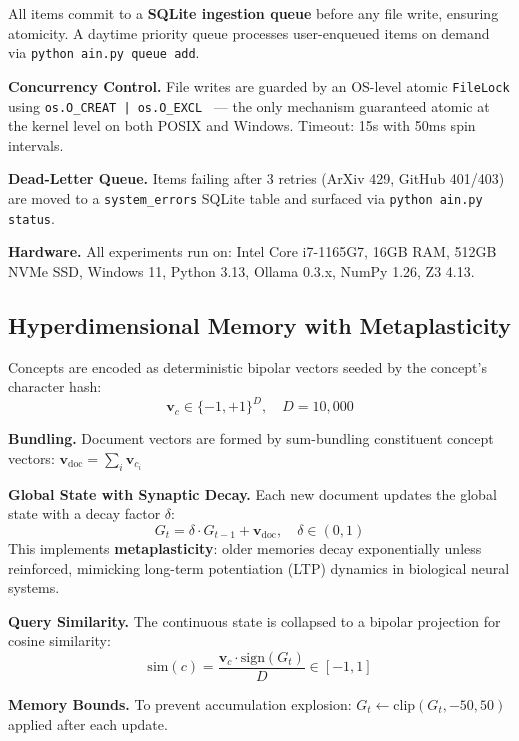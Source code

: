 \documentclass[sigconf]{acmart}
\begin{document}
All items commit to a \textbf{SQLite ingestion queue} before any file write, ensuring atomicity. A daytime priority queue processes user-enqueued items on demand via \texttt{python ain.py queue add}.

\textbf{Concurrency Control.} File writes are guarded by an OS-level atomic \texttt{FileLock} using \texttt{os.O\_CREAT | os.O\_EXCL}~\cite{posix_open} --- the only mechanism guaranteed atomic at the kernel level on both POSIX and Windows. Timeout: 15s with 50ms spin intervals.

\textbf{Dead-Letter Queue.} Items failing after 3 retries (ArXiv 429, GitHub 401/403) are moved to a \texttt{system\_errors} SQLite table and surfaced via \texttt{python ain.py status}.

\textbf{Hardware.} All experiments run on: Intel Core i7-1165G7, 16GB RAM, 512GB NVMe SSD, Windows 11, Python 3.13, Ollama 0.3.x, NumPy 1.26, Z3 4.13.

\subsection{Hyperdimensional Memory with Metaplasticity}

Concepts are encoded as deterministic bipolar vectors seeded by the concept's character hash:
\[
  \mathbf{v}_c \in \{-1, +1\}^D, \quad D = 10{,}000
\]

\textbf{Bundling.} Document vectors are formed by sum-bundling constituent concept vectors:
$\mathbf{v}_{\text{doc}} = \sum_i \mathbf{v}_{c_i}$

\textbf{Global State with Synaptic Decay.} Each new document updates the global state with a decay factor $\delta$:
\begin{equation}
  G_t = \delta \cdot G_{t-1} + \mathbf{v}_{\text{doc}}, \quad \delta \in (0, 1)
\label{eq:decay}
\end{equation}
This implements \textbf{metaplasticity}: older memories decay exponentially unless reinforced, mimicking long-term potentiation (LTP) dynamics in biological neural systems.

\textbf{Query Similarity.} The continuous state is collapsed to a bipolar projection for cosine similarity:
\begin{equation}
  \text{sim}(c) = \frac{\mathbf{v}_c \cdot \text{sign}(G_t)}{D} \in [-1, 1]
\label{eq:sim}
\end{equation}

\textbf{Memory Bounds.} To prevent accumulation explosion: $G_t \leftarrow \text{clip}(G_t, -50, 50)$ applied after each update.
\end{document}
